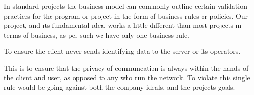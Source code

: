 In standard projects the business model can commonly outline certain validation practices for the program or project in the form of business rules or policies. Our project, and its fundamental idea, works a little different than most projects in terms of business, as per such we have only one business rule.

To ensure the client never sends identifying data to the server or its operators.

This is to ensure that the privacy of communcation is always within the hands of the client and user, as opposed to any who run the network. To violate this single rule would be going against both the company ideals, and the projects goals.
